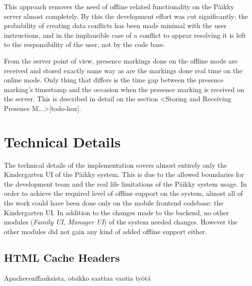 This approach removes the need of offline related functionality on the Päikky server almost completely. By this the development effort was cut significantly: the probability of creating data conflicts has been made minimal with the user instructions, and in the implausible case of a conflict to appear resolving it is left to the responsibility of the user, not by the code base. 

From the server point of view, presence markings done on the offline mode are received and stored exactly same way as are the markings done real time on the online mode. Only thing that differs is the time gap between the presence marking's timestamp and the occasion when the presence marking is received on the server. This is described in detail on the section <Storing and Receiving Presence M...>[todo-hox]. %





\section{Technical Details}
The technical details of the implementation covers almost entirely only the Kindergarten UI of the Päikky system. This is due to the allowed boundaries for the development team and the real life limitations of the Päikky system usage. In order to achieve the required level of offline support on the system, almost all of the work could have been done only on the mobile frontend codebase: the Kindergarten UI. In addition to the changes made to the backend, no other modules (\textit{Family UI, Manager UI}) of the system needed changes. However the other modules did not gain any kind of added offline support either.


\subsection{HTML Cache Headers}
Apacheconffauksista, otsikko saattaa vaatia työtä




